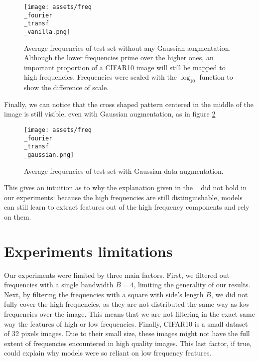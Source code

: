 \documentclass{article} \author{Simon Théorêt}
\begin{document}
\begin{figure}[h!]
  \centering
  \texttt{[image: assets/freq\\\_fourier\\\_transf\\\_vanilla.png]}
  \caption{Average frequencies of test set without any Gaussian
    augmentation. Although the lower frequencies prime over the higher
    ones, an important proportion of a CIFAR10 image will still be
    mapped to high frequencies. Frequencies were scaled with the
    $\log_{10}$ function to show the difference of scale. }
	\label{fig:fouriervanillafreq}
\end{figure}
Finally, we can notice that the cross shaped pattern centered in the
middle of the image is still visible, even with Gaussian augmentation,
as in figure \ref{fig:fouriergaussianfreq}
\begin{figure}[h!]
  \centering \texttt{[image: assets/freq\\\_fourier\\\_transf\\\_gaussian.png]}
  \caption{Average frequencies of test set with Gaussian data
    augmentation.}
	\label{fig:fouriergaussianfreq}
\end{figure}
This gives an intuition as to why the explanation given in the
~\citep{yin2020fourier} did not hold in our experiments: because the
high frequencies are still distinguishable, models can still learn to
extract features out of the high frequency components and rely on
them.

\section{Experiments limitations}
Our experiments were limited by three main factors. First, we filtered
out frequencies with a single bandwidth $B=4$, limiting the generality
of our results. Next, by filtering the frequencies with a square with
side's length $B$, we did not fully cover the high frequencies, as
they are not distributed the same way as low frequencies over the
image. This means that we are not filtering in the exact same way the
features of high or low frequencies. Finally, CIFAR10 is a small
dataset of 32 pixels images. Due to their small size, these images
might not have the full extent of frequencies encountered in high
quality images. This last factor, if true, could explain why models
were so reliant on low frequency features.
\end{document}
